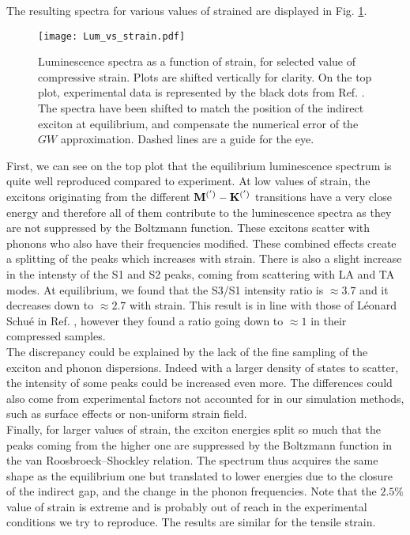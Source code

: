 The resulting spectra for various values of strained are displayed in Fig. \ref{fig:Lum_vs_strain}.
\begin{figure}[tbp]
	\vspace{0.2cm}
	\setcapindent{2em}
	\centering
	\texttt{[image: Lum\_vs\_strain.pdf]}
	\caption{Luminescence spectra as a function of strain, for selected value of compressive strain. Plots are shifted vertically for clarity. On the top plot, experimental data is represented by the black dots from Ref. \cite{schue2019bright}. The spectra have been shifted to match the position of the indirect exciton at equilibrium, and compensate the numerical error of the $GW$ approximation.\cite{artus2021ellipsometry} Dashed lines are a guide for the eye.}
	\label{fig:Lum_vs_strain}
\end{figure}
First, we can see on the top plot that the equilibrium luminescence spectrum is quite well reproduced compared to experiment. At low values of strain, the excitons originating from the different $\bf{ M^{(')}} - \bf{ K^{(')}}$ transitions have a very close energy and therefore all of them contribute to the luminescence spectra as they are not suppressed by the Boltzmann function. These excitons scatter with phonons who also have their frequencies modified. These combined effects create a splitting of the peaks which increases with strain. There is also a slight increase in the intensty of the S1 and S2 peaks, coming from scattering with LA and TA modes. At equilibrium, we found that the S3/S1 intensity ratio is $\approx 3.7$ and it decreases down to $\approx 2.7$ with strain. This result is in line with those of Léonard Schué in Ref. \cite{schue2017proprietes}, however they found a ratio going down to $\approx 1$ in their compressed samples.\\ The discrepancy could be explained by the lack of the fine sampling of the exciton and phonon dispersions. Indeed with a larger density of states to scatter, the intensity of some peaks could be increased even more. The differences could also come from experimental factors not accounted for in our simulation methods, such as surface effects or non-uniform strain field.\\
Finally, for larger values of strain, the exciton energies split so much that the peaks coming from the higher one are suppressed by the Boltzmann function in the van Roosbroeck--Shockley relation. The spectrum thus acquires the same shape as the equilibrium one but translated to lower energies due to the closure of the indirect gap, and the change in the phonon frequencies. Note that the $2.5\%$ value of strain is extreme and is probably out of reach in the experimental conditions we try to reproduce. The results are similar for the tensile strain.

